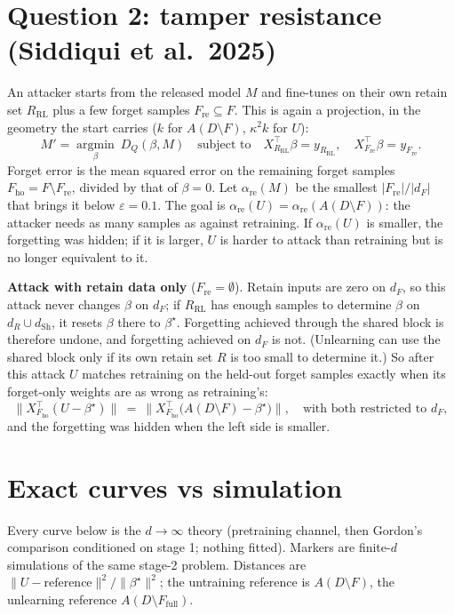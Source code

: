 \documentclass[10pt]{article}
\newcommand{\Ff}{F_{\mathrm{full}}}
\newcommand{\dSh}{d_{\mathrm{Sh}}}
\begin{document}
\section{Question 2: tamper resistance (Siddiqui et al.\ 2025)}
An attacker starts from the released model $M$ and fine-tunes on their own retain set $R_{\mathrm{RL}}$ plus a few forget samples $F_{\mathrm{re}}\subseteq F$. This is again a projection, in the geometry the start carries ($k$ for $A(D\setminus F)$, $\kappa^2k$ for $U$):
\[
M'=\operatorname*{argmin}_\beta\ D_Q(\beta,M)\quad\text{subject to}\quad X_{R_{\mathrm{RL}}}^\top\beta=y_{R_{\mathrm{RL}}},\quad X_{F_{\mathrm{re}}}^\top\beta=y_{F_{\mathrm{re}}} .
\]
Forget error is the mean squared error on the remaining forget samples $F_{\mathrm{ho}}=F\setminus F_{\mathrm{re}}$, divided by that of $\beta=0$. Let $\alpha_{\mathrm{re}}(M)$ be the smallest $|F_{\mathrm{re}}|/|d_F|$ that brings it below $\varepsilon=0.1$. The goal is $\alpha_{\mathrm{re}}(U)=\alpha_{\mathrm{re}}(A(D\setminus F))$: the attacker needs as many samples as against retraining. If $\alpha_{\mathrm{re}}(U)$ is smaller, the forgetting was hidden; if it is larger, $U$ is harder to attack than retraining but is no longer equivalent to it.

\textbf{Attack with retain data only} ($F_{\mathrm{re}}=\emptyset$). Retain inputs are zero on $d_F$, so this attack never changes $\beta$ on $d_F$; if $R_{\mathrm{RL}}$ has enough samples to determine $\beta$ on $d_R\cup\dSh$, it resets $\beta$ there to $\beta^\star$. Forgetting achieved through the shared block is therefore undone, and forgetting achieved on $d_F$ is not. (Unlearning can use the shared block only if its own retain set $R$ is too small to determine it.) So after this attack $U$ matches retraining on the held-out forget samples exactly when its forget-only weights are as wrong as retraining's:
\[
\big\|X_{F_{\mathrm{ho}}}^\top(U-\beta^\star)\big\|\ =\ \big\|X_{F_{\mathrm{ho}}}^\top\big(A(D\setminus F)-\beta^\star\big)\big\|,\quad\text{with both restricted to } d_F ,
\]
and the forgetting was hidden when the left side is smaller.

\section{Exact curves vs simulation}\label{sec:curves}
Every curve below is the $d\to\infty$ theory (pretraining channel, then Gordon's comparison conditioned on stage 1; nothing fitted). Markers are finite-$d$ simulations of the same stage-2 problem. Distances are $\|U-\text{reference}\|^2/\|\beta^\star\|^2$; the untraining reference is $A(D\setminus F)$, the unlearning reference $A(D\setminus\Ff)$.
\end{document}

